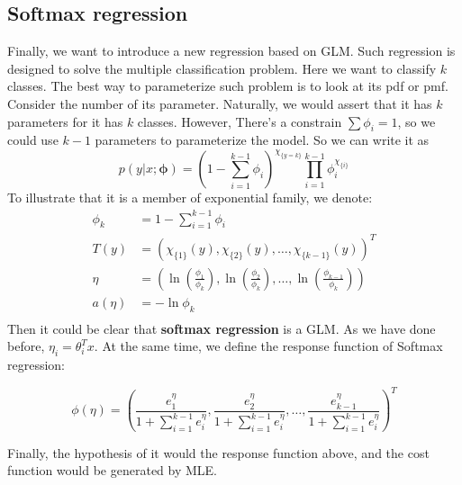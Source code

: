 \subsection{Softmax regression}
Finally, we want to introduce a new regression based on GLM. Such regression is designed to solve the multiple classification problem. Here we want to classify $k$ classes. 
The best way to parameterize such problem is to look at its pdf or pmf. Consider the number of its parameter. Naturally, we would assert that it has $k$ parameters for it has $k$ classes. However,
There's a constrain $\sum \phi_i = 1$, so we could use $k-1$ parameters to parameterize the model.
So we can write it as
\[p(y|x;\mathbf{\phi}) = \left(1-\sum_{i=1}^{k-1}\phi_i\right)^{\chi_{\{y=k\}}}\prod_{i=1}^{k-1} \phi_i^{\chi_{\{i\}}}\]
To illustrate that it is a member of exponential family, we denote:
\begin{align*}
    \phi_k &= 1 - \sum_{i=1}^{k-1} \phi_i \\
    T(y) &= \left(\chi_{\{1\}}(y), \chi_{\{2\}}(y), \ldots, \chi_{\{k-1\}}(y)\right)^T\\
    \eta &= \left(\ln\left(\frac{\phi_1}{\phi_k}\right), \ln\left(\frac{\phi_2}{\phi_k}\right), \ldots, \ln\left(\frac{\phi_{k-1}}{\phi_k}\right)\right)\\
    a(\eta) &= -\ln\phi_k\\
\end{align*}
Then it could be clear that \textbf{softmax regression} is a GLM. As we have done before, $\eta_i = \theta_i^Tx$. At the same time, we define the response function of Softmax regression:
\begin{define}
    \[\phi(\eta) = \left(\frac{e^\eta_1}{1+\sum_{i=1}^{k-1}e^\eta_i},\frac{e^\eta_2}{1+\sum_{i=1}^{k-1}e^\eta_i},\ldots,\frac{e^\eta_{k-1}}{1+\sum_{i=1}^{k-1}e^\eta_i}\right)^T\]
\end{define}
Finally, the hypothesis of it would the response function above, and the cost function would be generated by MLE.

